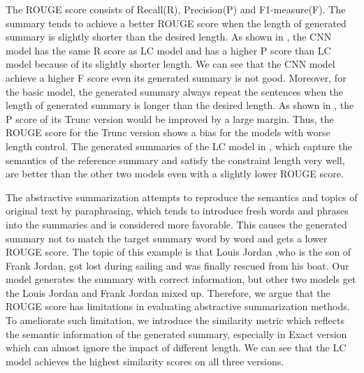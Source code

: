 The ROUGE score consists of Recall(R), Precision(P) and F1-measure(F). 
The summary tends to achieve a better ROUGE score 
when the length of generated summary is slightly shorter than 
the desired length.
As shown in , 
the CNN model has the same R score 
as LC model and has a higher P score than LC model because of its slightly
shorter length.  
We can see that the CNN model achieve a higher F score even its generated summary is not good. 
Moreover, for the basic model,
the generated summary always repeat the sentences
when the length of generated summary is longer than the desired length.
As shown in , 
the P score of its Trunc version would be improved
by a large margin.
Thus, the ROUGE score for the Trunc version shows a bias for 
the models with worse length control.
The generated summaries of the LC model in , which capture the semantics of the reference summary and 
satisfy the constraint length very well,
are better than the other two models even with a slightly lower ROUGE score.

The abstractive 
summarization attempts to reproduce the semantics 
and topics of original text
by paraphrasing, which tends to introduce fresh words and phrases into the summaries and is considered
more favorable. 
This causes the generated summary not to match the target 
summary word by word and gets a lower ROUGE score.
The topic of this example is that Louis Jordan ,who is the son of Frank Jordan, 
got lost during sailing and was finally rescued from his boat. 
Our model generates the summary with correct
information, but other two models get the Louis Jordan and Frank Jordan mixed up.
Therefore, we argue that
the ROUGE score has limitations in evaluating 
abstractive summarization methods.
To ameliorate such limitation, 
we introduce the similarity metric which reflects the semantic information of the 
generated summary, especially in Exact version which can almost ignore the 
impact of different length.
We can see that the LC model achieves the highest similarity scores on
all three versions.

